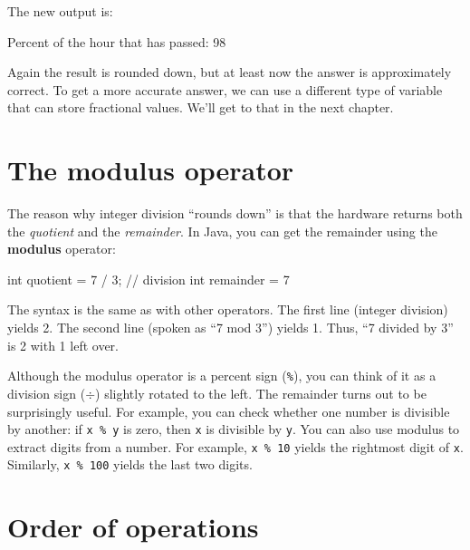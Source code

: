 The new output is:

\begin{stdout}
Percent of the hour that has passed: 98
\end{stdout}

Again the result is rounded down, but at least now the answer is approximately correct.
To get a more accurate answer, we can use a different type of variable that can store fractional values.
We'll get to that in the next chapter.


\section{The modulus operator}


The reason why integer division ``rounds down'' is that the hardware returns both the {\em quotient} and the {\em remainder}.
In Java, you can get the remainder using the {\bf modulus} operator:

\begin{code}
    int quotient = 7 / 3;   // division
    int remainder = 7 %
\end{code}

The syntax is the same as with other operators.
The first line (integer division) yields 2.
The second line (spoken as ``7 mod 3'') yields 1.
Thus, ``7 divided by 3'' is 2 with 1 left over.


Although the modulus operator is a percent sign ({\tt \%}), you can think of it as a division sign ($\div$) slightly rotated to the left.
The remainder turns out to be surprisingly useful.
For example, you can check whether one number is divisible by another: if {\tt x \% y} is zero, then {\tt x} is divisible by {\tt y}.
You can also use modulus to extract digits from a number.
For example, {\tt x \% 10} yields the rightmost digit of {\tt x}.
Similarly, {\tt x \% 100} yields the last two digits.


\section{Order of operations}


